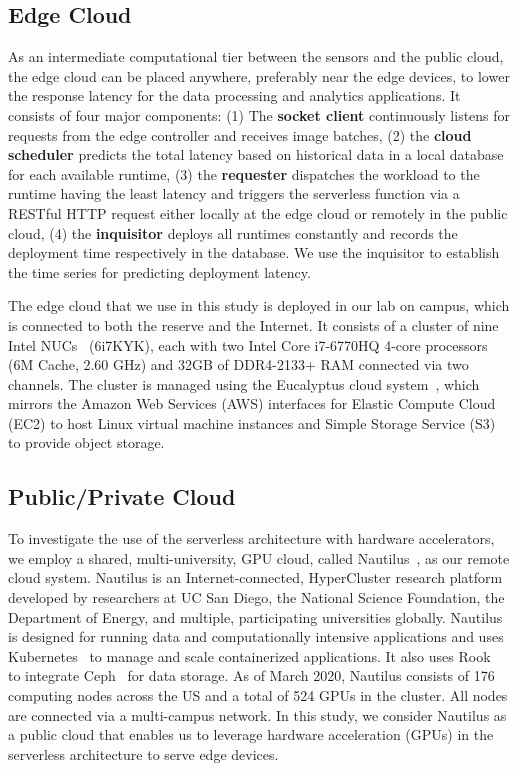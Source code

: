  \subsection{Edge Cloud}
As an intermediate computational tier between the sensors and the public cloud, the edge cloud can be placed anywhere, preferably near the edge devices, to lower the response latency for the data processing and analytics applications. It consists of four major components: (1) The \textbf{socket client} continuously listens for requests from the edge controller and receives image batches, (2) the \textbf{cloud scheduler} predicts the total latency based on historical data in a local database for each available runtime, (3) the \textbf{requester} dispatches the workload to the runtime having the least latency and triggers the  serverless function via a RESTful HTTP request either locally at the edge cloud or remotely in the public cloud, (4) the \textbf{inquisitor} deploys all runtimes constantly and records the deployment time respectively in the database. We use the inquisitor to establish the time series for predicting deployment latency.

The edge cloud that we use in this study is deployed 
in our lab on campus, which is connected to both the reserve and the Internet. It consists of a cluster of nine Intel NUCs~\cite{ref:nucs} (6i7KYK), each with two Intel Core i7-6770HQ 4-core processors (6M Cache, 2.60 GHz) and 32GB of DDR4-2133+ RAM connected via two channels. The cluster is managed using the Eucalyptus cloud system~\cite{ref:euca}, which mirrors the Amazon Web Services (AWS) interfaces for Elastic Compute Cloud (EC2) to host Linux virtual machine instances and Simple Storage Service (S3) to provide object storage.
 
 \subsection{Public/Private Cloud}

To investigate the use of the serverless architecture with hardware accelerators, we employ a shared, multi-university, GPU cloud, called  Nautilus~\cite{ref:nautilus}, as our remote cloud system. Nautilus is an Internet-connected, HyperCluster research platform developed by researchers at UC San Diego, the National Science Foundation, the Department of Energy, and multiple, participating universities globally.  Nautilus is designed for running data and computationally intensive applications and uses Kubernetes~\cite{ref:k8s} to manage and scale containerized applications. It also uses Rook~\cite{ref:rook} to integrate Ceph~\cite{ref:ceph} for data storage. As of March 2020, Nautilus consists of 176 computing nodes across the US and a total of 524 GPUs in the cluster. All nodes are connected via a multi-campus network. In this study, we consider Nautilus as a public cloud that enables us to leverage hardware acceleration (GPUs) in the serverless architecture to serve edge devices. 

